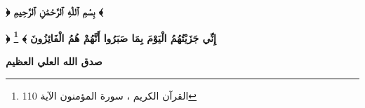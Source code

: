 \renewcommand{\thefootnote}{\fnsymbol{footnote}}

\chapter*{}
\vfill
\begin{center}
	{\amirifont \Large\textbf{﴿ بِسْمِ ٱللّٰهِ ٱلرَّحْمَٰنِ ٱلرَّحِيمِ ﴾}}
\end{center}
\thispagestyle{empty}
{\amirifont	\begin{center}\bfseries\huge
		﴿ إِنِّي جَزَيْتُهُمُ الْيَوْمَ بِمَا صَبَرُوا أَنَّهُمْ هُمُ الْفَائِزُونَ ﴾
		\footnote{ القرآن الكريم ، سورة المؤمنون الآية 110}
	\end{center}
	\hfill \textbf{صدق الله العلي العظيم}
}
\vfill
